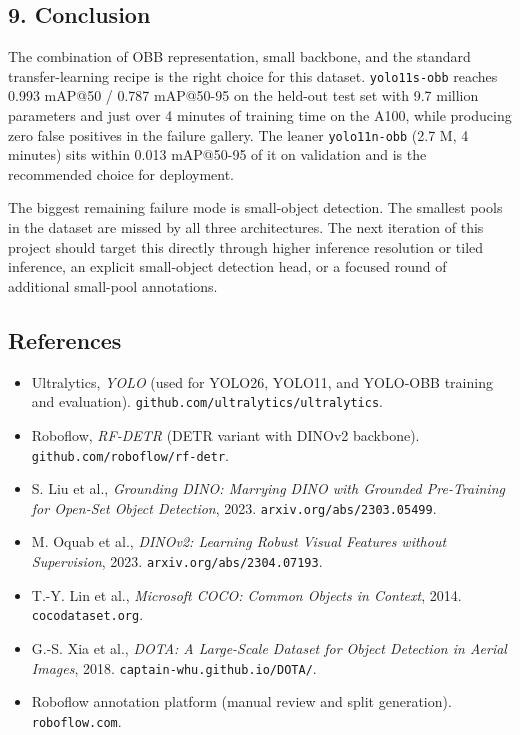 \documentclass[11pt
]{article}
\providecommand{\tightlist}{%
  \setlength{\itemsep}{0pt}\setlength{\parskip}{0pt}}
\begin{document}
\subsection{9. Conclusion}\label{conclusion}

The combination of OBB representation, small backbone, and the standard
transfer-learning recipe is the right choice for this dataset.
\texttt{yolo11s-obb} reaches 0.993 mAP@50 / 0.787 mAP@50-95 on the
held-out test set with 9.7 million parameters and just over 4 minutes of
training time on the A100, while producing zero false positives in the
failure gallery. The leaner \texttt{yolo11n-obb} (2.7 M, 4 minutes) sits
within 0.013 mAP@50-95 of it on validation and is the recommended choice
for deployment.

The biggest remaining failure mode is small-object detection. The
smallest pools in the dataset are missed by all three architectures.
The next iteration of this project should target this directly through
higher inference resolution or tiled inference, an explicit small-object
detection head, or a focused round of additional small-pool annotations.

\subsection{References}\label{references}

\begin{itemize}
\tightlist
\item
  Ultralytics, \emph{YOLO} (used for YOLO26, YOLO11, and YOLO-OBB
  training and evaluation). \texttt{github.com/ultralytics/ultralytics}.
\item
  Roboflow, \emph{RF-DETR} (DETR variant with DINOv2 backbone).
  \texttt{github.com/roboflow/rf-detr}.
\item
  S. Liu et al., \emph{Grounding DINO: Marrying DINO with Grounded
  Pre-Training for Open-Set Object Detection}, 2023.
  \texttt{arxiv.org/abs/2303.05499}.
\item
  M. Oquab et al., \emph{DINOv2: Learning Robust Visual Features without
  Supervision}, 2023. \texttt{arxiv.org/abs/2304.07193}.
\item
  T.-Y. Lin et al., \emph{Microsoft COCO: Common Objects in Context},
  2014. \texttt{cocodataset.org}.
\item
  G.-S. Xia et al., \emph{DOTA: A Large-Scale Dataset for Object
  Detection in Aerial Images}, 2018.
  \texttt{captain-whu.github.io/DOTA/}.
\item
  Roboflow annotation platform (manual review and split generation).
  \texttt{roboflow.com}.
\end{itemize}
\end{document}

